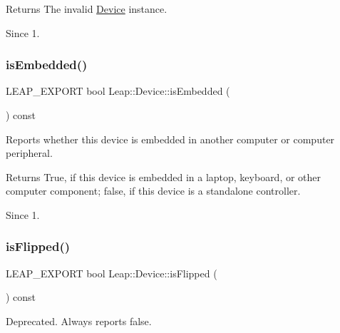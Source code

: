 \begin{DoxyCodeInclude}
\end{DoxyCodeInclude}


\begin{DoxyReturn}{Returns}
The invalid \hyperlink{class_leap_1_1_device}{Device} instance. 
\end{DoxyReturn}
\begin{DoxySince}{Since}
1. 
\end{DoxySince}
\mbox{\label{class_leap_1_1_device_a5d5ae9a0fe53f99acd634e5dc377f2fe}} 
\subsubsection{\texorpdfstring{is\+Embedded()}{isEmbedded()}}
{\footnotesize\ttfamily L\+E\+A\+P\+\_\+\+E\+X\+P\+O\+RT bool Leap\+::\+Device\+::is\+Embedded (\begin{DoxyParamCaption}{ }\end{DoxyParamCaption}) const}

Reports whether this device is embedded in another computer or computer peripheral.

\begin{DoxyReturn}{Returns}
True, if this device is embedded in a laptop, keyboard, or other computer component; false, if this device is a standalone controller. 
\end{DoxyReturn}
\begin{DoxySince}{Since}
1. 
\end{DoxySince}
\mbox{\label{class_leap_1_1_device_ab384868ebc0ceb7325645691da90e470}} 
\subsubsection{\texorpdfstring{is\+Flipped()}{isFlipped()}}
{\footnotesize\ttfamily L\+E\+A\+P\+\_\+\+E\+X\+P\+O\+RT bool Leap\+::\+Device\+::is\+Flipped (\begin{DoxyParamCaption}{ }\end{DoxyParamCaption}) const}

Deprecated. Always reports false.

